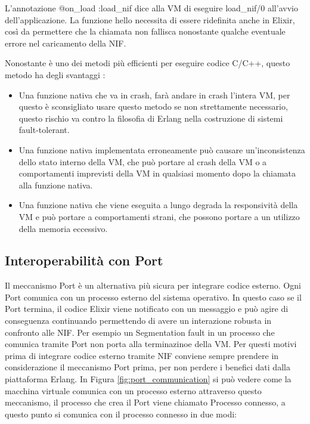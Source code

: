 L'annotazione @on\_load :load\_nif dice alla VM di eseguire load\_nif/0
all'avvio dell'applicazione.
La funzione hello necessita di essere ridefinita anche in Elixir,
così da permettere che la chiamata non fallisca nonostante qualche
eventuale errore nel caricamento della NIF.

Nonostante è uno dei metodi più efficienti per eseguire codice C/C++,
questo metodo ha degli svantaggi \cite{Erlanger73:online}:

\begin{itemize}
	\item Una funzione nativa che va in crash, farà andare in crash l'intera
	VM, per questo è sconsigliato usare questo metodo se non strettamente necessario,
	questo rischio va contro la filosofia di Erlang nella costruzione di sistemi
	fault-tolerant.
	\item Una funzione nativa implementata erroneamente può causare
	un'inconsistenza dello stato interno della VM, che può portare 
	al crash della VM o a comportamenti imprevisti della VM in 
	qualsiasi momento dopo la chiamata alla funzione nativa.
	\item Una funzione nativa che viene eseguita a lungo degrada la
	responsività della VM e può portare a comportamenti strani, che possono
	portare a un utilizzo della memoria eccessivo.
\end{itemize}

\subsection{Interoperabilità con Port}

Il meccanismo Port è un alternativa più sicura per
integrare codice esterno. Ogni Port comunica con un
processo esterno del sistema operativo.
In questo caso se il Port termina, il codice Elixir
viene notificato con un messaggio e può agire di conseguenza
continuando permettendo di avere un interazione robusta
in confronto alle NIF. Per esempio un Segmentation fault
in un processo che comunica tramite Port non porta alla
terminazinoe della VM. Per questi motivi prima di integrare
codice esterno tramite NIF conviene sempre prendere in considerazione
il meccanismo Port prima, per non perdere i benefici dati dalla
piattaforma Erlang. In Figura \ref{fig:port_communication}
si può vedere come la macchina virtuale comunica con un
processo esterno attraverso questo meccanismo, il processo che
crea il Port viene chiamato Processo connesso, a questo punto
si comunica con il processo connesso in due modi:

